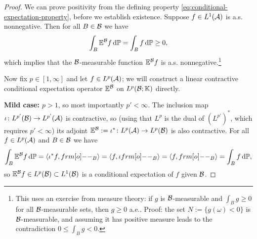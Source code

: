 \begin{proof}

  We can prove positivity from the defining property \eqref{eq:conditional-expectation-property}, before we establish existence.
  Suppose $f \in L^1(\mathcal{A})$ is a.s. nonnegative.
  Then for all $B \in \mathcal{B}$ we have
  \begin{equation*}
    \int_B \mathbb{E}^{\mathcal{B}} f \, \mathrm{d}\mathbb{P} = \int_B f \, \mathrm{d}\mathbb{P} \geq 0,
  \end{equation*}
  which implies that the $\mathcal{B}$-measurable function $\mathbb{E}^{\mathcal{B}}f$ is a.s. nonnegative.\footnote{This uses an exercise from measure theory: if $g$ is $\mathcal{B}$-measurable and $\int_B g \geq 0$ for all $\mathcal{B}$-measurable sets, then $g \geq 0$ a.e.. Proof: the set $N := \{g(\omega) < 0\}$ is $\mathcal{B}$-measurable, and assuming it has positive measure leads to the contradiction $0 \leq \int_B g < 0$.}
  
  Now fix $p \in [1,\infty]$ and let $f \in L^p(\mathcal{A})$; we will construct a linear contractive conditional expectation operator $\mathbb{E}^{\mathcal{B}}$ on $L^p(\mathcal{B};\mathbb{K})$ directly.

  \textbf{Mild case: $p > 1$}, so most importantly $p' < \infty$.
  The inclusion map $\iota \colon L^{p'}(\mathcal{B}) \rightarrow L^{p'}(\mathcal{A})$ is  contractive, so (using that $L^p$ is the dual of $(L^{p'})^*$, which requires $p' < \infty$) its adjoint $\mathbb{E}^{\mathcal{B}} := \iota^* \colon L^p(\mathcal{A}) \rightarrow L^p(\mathcal{B})$ is also contractive.
  For all $f \in L^p(\mathcal{A})$ and $B \in \mathcal{B}$ we have
  \begin{equation*}
    \int_B \E^{\mc{B}} f \, \dd\P = \langle \iota^* f, \1_{B} \rangle = \langle f, \iota \1_{B} \rangle = \langle f, \1_{B} \rangle = \int_B f \, \dd\P,
  \end{equation*}
  so $\mathbb{E}^{\mathcal{B}} f \in L^p(\mathcal{B}) \subset L^1(\mathcal{B})$ is a conditional expectation of $f$ given $\mathcal{B}$.



\end{proof}

